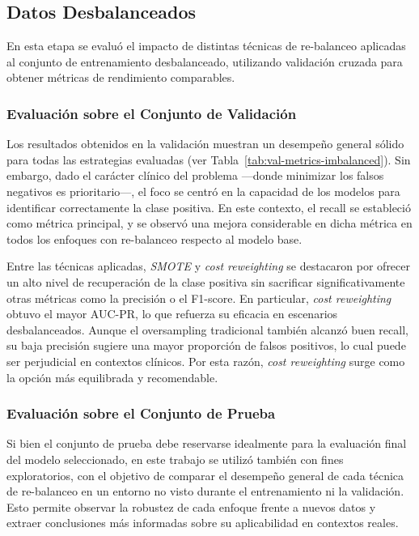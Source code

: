 \begin{multicols}{2}
\subsection{Datos Desbalanceados}

En esta etapa se evaluó el impacto de distintas técnicas de re-balanceo aplicadas al conjunto de entrenamiento desbalanceado, utilizando validación cruzada para obtener métricas de rendimiento comparables. 

\subsubsection{Evaluación sobre el Conjunto de Validación}

Los resultados obtenidos en la validación muestran un desempeño general sólido para todas las estrategias evaluadas (ver Tabla~\ref{tab:val-metrics-imbalanced}). Sin embargo, dado el carácter clínico del problema —donde minimizar los falsos negativos es prioritario—, el foco se centró en la capacidad de los modelos para identificar correctamente la clase positiva. En este contexto, el recall se estableció como métrica principal, y se observó una mejora considerable en dicha métrica en todos los enfoques con re-balanceo respecto al modelo base.

Entre las técnicas aplicadas, \textit{SMOTE} y \textit{cost reweighting} se destacaron por ofrecer un alto nivel de recuperación de la clase positiva sin sacrificar significativamente otras métricas como la precisión o el F1-score. En particular, \textit{cost reweighting} obtuvo el mayor AUC-PR, lo que refuerza su eficacia en escenarios desbalanceados. Aunque el oversampling tradicional también alcanzó buen recall, su baja precisión sugiere una mayor proporción de falsos positivos, lo cual puede ser perjudicial en contextos clínicos. Por esta razón, \textit{cost reweighting} surge como la opción más equilibrada y recomendable.


\subsubsection{Evaluación sobre el Conjunto de Prueba}

Si bien el conjunto de prueba debe reservarse idealmente para la evaluación final del modelo seleccionado, en este trabajo se utilizó también con fines exploratorios, con el objetivo de comparar el desempeño general de cada técnica de re-balanceo en un entorno no visto durante el entrenamiento ni la validación. Esto permite observar la robustez de cada enfoque frente a nuevos datos y extraer conclusiones más informadas sobre su aplicabilidad en contextos reales.


\end{multicols}
